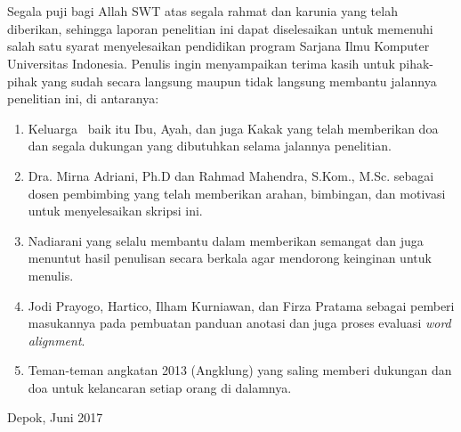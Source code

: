 \chapter*{\kataPengantar}

Segala puji bagi Allah SWT atas segala rahmat dan karunia yang telah diberikan, sehingga laporan penelitian ini dapat diselesaikan untuk memenuhi salah satu syarat menyelesaikan pendidikan program Sarjana Ilmu Komputer Universitas Indonesia. Penulis ingin menyampaikan terima kasih untuk pihak-pihak yang sudah secara langsung maupun tidak langsung membantu jalannya penelitian ini, di antaranya:

\begin{enumerate}
	\item Keluarga \saya~baik itu Ibu, Ayah, dan juga Kakak yang telah memberikan doa dan segala dukungan yang dibutuhkan selama jalannya penelitian.
	\item Dra. Mirna Adriani, Ph.D dan Rahmad Mahendra, S.Kom., M.Sc. sebagai dosen pembimbing yang telah memberikan arahan, bimbingan, dan motivasi untuk menyelesaikan skripsi ini.
	\item Nadiarani yang selalu membantu dalam memberikan semangat dan juga menuntut hasil penulisan secara berkala agar mendorong keinginan untuk menulis.
	\item Jodi Prayogo, Hartico, Ilham Kurniawan, dan Firza Pratama sebagai pemberi masukannya pada pembuatan panduan anotasi dan juga proses evaluasi \textit{word alignment}.
	\item Teman-teman angkatan 2013 (Angklung) yang saling memberi dukungan dan doa untuk kelancaran setiap orang di dalamnya.
	
	
\end{enumerate}
\vspace*{0.1cm}
\begin{flushright}
	Depok, Juni 2017\\[0.1cm]
	\vspace*{1cm}
	\penulis
	
\end{flushright}